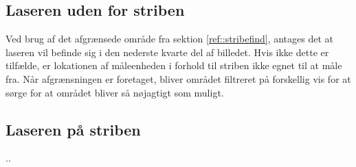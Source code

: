 \newpage

\subsection{Laseren uden for striben}
Ved brug af det afgrænsede område fra sektion \ref{ref::stribefind}, antages det at laseren vil befinde sig i den nederste kvarte del af billedet. Hvis ikke dette er tilfælde, er lokationen af måleenheden i forhold til striben ikke egnet til at måle fra.
Når afgrænsningen er foretaget, bliver området filtreret på forskellig vis for at sørge for at området bliver så nøjagtigt som muligt.

\subsection{Laseren på striben}
..